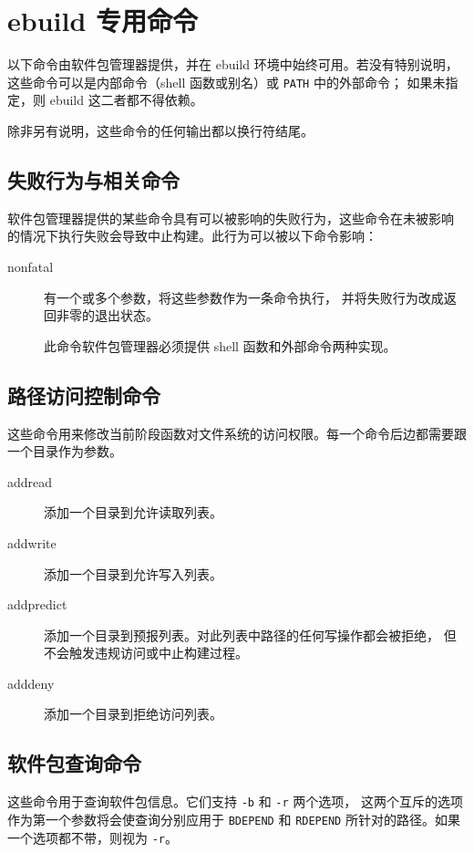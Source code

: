 \section{ebuild 专用命令}
\label{sec:pkg-mgr-commands}

以下命令由软件包管理器提供，并在 ebuild 环境中始终可用。若没有特别说明，
这些命令可以是内部命令（shell 函数或别名）或 \texttt{PATH} 中的外部命令；
如果未指定，则 ebuild 这二者都不得依赖。

除非另有说明，这些命令的任何输出都以换行符结尾。

\subsection{失败行为与相关命令}
\label{sec:failure-behaviour}

软件包管理器提供的某些命令具有可以被影响的失败行为，这些命令在未被影响
的情况下执行失败会导致中止构建。此行为可以被以下命令影响：
\begin{description}
\item[nonfatal] 有一个或多个参数，将这些参数作为一条命令执行，
    并将失败行为改成返回非零的退出状态。

    此命令软件包管理器必须提供 shell 函数和外部命令两种实现。
\end{description}

\subsection{路径访问控制命令}
这些命令用来修改当前阶段函数对文件系统的访问权限。每一个命令后边都需要跟一个目录作为参数。
\begin{description}
\item[addread] 添加一个目录到允许读取列表。
\item[addwrite] 添加一个目录到允许写入列表。
\item[addpredict] 添加一个目录到预报列表。对此列表中路径的任何写操作都会被拒绝，
    但不会触发违规访问或中止构建过程。
\item[adddeny] 添加一个目录到拒绝访问列表。
\end{description}

\subsection{软件包查询命令}
这些命令用于查询软件包信息。它们支持 \texttt{-b} 和 \texttt{-r} 两个选项，
这两个互斥的选项作为第一个参数将会使查询分别应用于 \texttt{BDEPEND} 和
\texttt{RDEPEND} 所针对的路径。如果一个选项都不带，则视为 \texttt{-r}。

